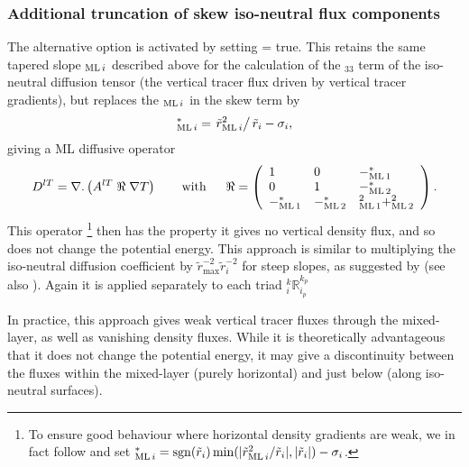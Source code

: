 \documentclass[../main/NEMO_manual]{subfiles}
\begin{document}
\subsubsection{Additional truncation of skew iso-neutral flux components}
\label{subsec:TRIADS_Gerdes-taper}

The alternative option is activated by setting  = true.
This retains the same tapered slope $_{\mathrm{ML}\,i}$  described above for the calculation of the $_{33}$ term of
the iso-neutral diffusion tensor (the vertical tracer flux driven by vertical tracer gradients),
but replaces the $_{\mathrm{ML}\,i}$ in the skew term by
\begin{equation}
  \label{eq:TRIADS_rm*}
  _{\mathrm{ML}\,i}^*=\left.\tilde{r}_{\mathrm{ML}\,i}^2\right/\tilde{r}_i-\sigma_i,
\end{equation}
giving a ML diffusive operator
\[
  D^{lT}=\nabla {\mathrm {\mathbf .}}\left( {A^{lT}\;\Re \;\nabla T} \right) \qquad
  \mbox{with}\quad \;\;\Re =\left( {{
        \begin{array}{*{20}c}
          1 \hfill & 0 \hfill & {-\rML[1]^*}\hfill \\
          0 \hfill & 1 \hfill & {-\rML[2]^*} \hfill \\
          {-\rML[1]^*}\hfill &   {-\rML[2]^*} \hfill & {\rML[1]^2+\rML[2]^2} \hfill \\
        \end{array}
      }} \right).
\]
This operator
\footnote{
  To ensure good behaviour where horizontal density gradients are weak,
  we in fact follow \citet{gerdes.koberle.ea_CD91} and
  set $_{\mathrm{ML}\,i}^*=\mathrm{sgn}(\tilde{r}_i)\min(|\tilde{r}_{\mathrm{ML}\,i}^2/\tilde{r}_i|,|\tilde{r}_i|)-\sigma_i$.
}
then has the property it gives no vertical density flux, and so does not change the potential energy.
This approach is similar to multiplying the iso-neutral diffusion coefficient by
$\tilde{r}_{\mathrm{max}}^{-2}\tilde{r}_i^{-2}$ for steep slopes,
as suggested by \citet{gerdes.koberle.ea_CD91} (see also \citet{griffies_bk04}).
Again it is applied separately to each triad $_i^k\mathbb{R}_{i_p}^{k_p}$

In practice, this approach gives weak vertical tracer fluxes through the mixed-layer,
as well as vanishing density fluxes.
While it is theoretically advantageous that it does not change the potential energy,
it may give a discontinuity between the fluxes within the mixed-layer (purely horizontal) and
just below (along iso-neutral surfaces).
\end{document}

